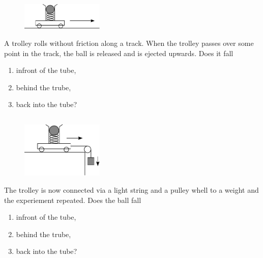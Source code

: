 	\subsection{}
		\begin{figure}
		  \vspace{-20pt}
		  \begin{center}
		  	\includegraphics[width=0.35\textwidth]{trolley1.pdf}
		  \end{center}
		  \vspace{-20pt}
		\end{figure}
		A trolley rolls without friction along a track. When the trolley passes over some point in the track, the ball is released and is ejected upwards. Does it fall 
		\begin{enumerate}[label=\alph*)]
			\item infront of the tube,
			\item behind the trube,
			\item back into the tube?
		\end{enumerate}

	\subsection{}
		\begin{figure}
		  \vspace{-20pt}
		  \begin{center}
		  	\includegraphics[width=0.35\textwidth]{trolley2.pdf}
		  \end{center}
		  \vspace{-20pt}
		\end{figure}
		The trolley is now connected via a light string and a pulley whell to a weight and the experiement repeated. Does the ball fall
		\begin{enumerate}[label=\alph*)]
			\item infront of the tube,
			\item behind the trube,
			\item back into the tube?
		\end{enumerate}

